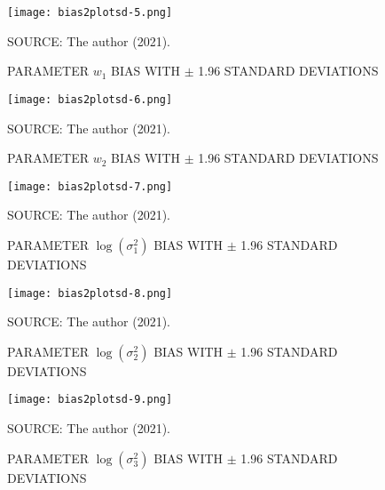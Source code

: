 \begin{figure}[H]
 \setlength{\abovecaptionskip}{.0001pt}
 \caption{PARAMETER \(w_{1}\) BIAS WITH \(\pm\) 1.96 STANDARD DEVIATIONS}
 \vspace{0.2cm}\centering
 \texttt{[image: bias2plotsd-5.png]}\\
 \begin{footnotesize}
  SOURCE: The author (2021).
 \end{footnotesize}
 \label{fig:biassdw1}
\end{figure}

\begin{figure}[H]
 \setlength{\abovecaptionskip}{.0001pt}
 \caption{PARAMETER \(w_{2}\) BIAS WITH \(\pm\) 1.96 STANDARD DEVIATIONS}
 \vspace{0.2cm}\centering
 \texttt{[image: bias2plotsd-6.png]}\\
 \begin{footnotesize}
  SOURCE: The author (2021).
 \end{footnotesize}
 \label{fig:biassdw2}
\end{figure}

\begin{figure}[H]
 \setlength{\abovecaptionskip}{.0001pt}
 \caption{PARAMETER \(\log(\sigma_{1}^{2})\) BIAS WITH \(\pm\) 1.96
          STANDARD DEVIATIONS}
 \vspace{0.2cm}\centering
 \texttt{[image: bias2plotsd-7.png]}\\
 \begin{footnotesize}
  SOURCE: The author (2021).
 \end{footnotesize}
 \label{fig:biassdlogs2_1}
\end{figure}

\begin{figure}[H]
 \setlength{\abovecaptionskip}{.0001pt}
 \caption{PARAMETER \(\log(\sigma_{2}^{2})\) BIAS WITH \(\pm\) 1.96
          STANDARD DEVIATIONS}
 \vspace{0.2cm}\centering
 \texttt{[image: bias2plotsd-8.png]}\\
 \begin{footnotesize}
  SOURCE: The author (2021).
 \end{footnotesize}
 \label{fig:biassdlogs2_2}
\end{figure}

\begin{figure}[H]
 \setlength{\abovecaptionskip}{.0001pt}
 \caption{PARAMETER \(\log(\sigma_{3}^{2})\) BIAS WITH \(\pm\) 1.96
          STANDARD DEVIATIONS}
 \vspace{0.2cm}\centering
 \texttt{[image: bias2plotsd-9.png]}\\
 \begin{footnotesize}
  SOURCE: The author (2021).
 \end{footnotesize}
 \label{fig:biassdlogs2_3}
\end{figure}

